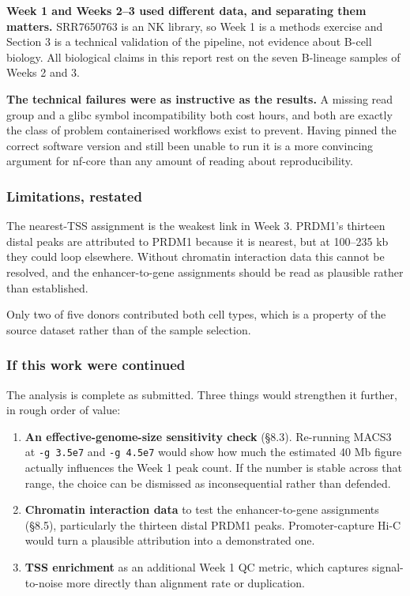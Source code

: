 \documentclass[
  11pt,
  a4paper,
]{article}
\providecommand{\tightlist}{%
  \setlength{\itemsep}{0pt}\setlength{\parskip}{0pt}}
\begin{document}
\textbf{Week 1 and Weeks 2--3 used different data, and separating them
matters.} SRR7650763 is an NK library, so Week 1 is a methods exercise
and Section 3 is a technical validation of the pipeline, not evidence
about B-cell biology. All biological claims in this report rest on the
seven B-lineage samples of Weeks 2 and 3.

\textbf{The technical failures were as instructive as the results.} A
missing read group and a glibc symbol incompatibility both cost hours,
and both are exactly the class of problem containerised workflows exist
to prevent. Having pinned the correct software version and still been
unable to run it is a more convincing argument for nf-core than any
amount of reading about reproducibility.

\hypertarget{limitations-restated}{%
\subsubsection{Limitations, restated}\label{limitations-restated}}

The nearest-TSS assignment is the weakest link in Week 3. PRDM1's
thirteen distal peaks are attributed to PRDM1 because it is nearest, but
at 100--235 kb they could loop elsewhere. Without chromatin interaction
data this cannot be resolved, and the enhancer-to-gene assignments
should be read as plausible rather than established.

Only two of five donors contributed both cell types, which is a property
of the source dataset rather than of the sample selection.

\hypertarget{if-this-work-were-continued}{%
\subsubsection{If this work were
continued}\label{if-this-work-were-continued}}

The analysis is complete as submitted. Three things would strengthen it
further, in rough order of value:

\begin{enumerate}
\def\labelenumi{\arabic{enumi}.}
\tightlist
\item
  \textbf{An effective-genome-size sensitivity check} (§8.3). Re-running
  MACS3 at \texttt{-g\ 3.5e7} and \texttt{-g\ 4.5e7} would show how much
  the estimated 40 Mb figure actually influences the Week 1 peak count.
  If the number is stable across that range, the choice can be dismissed
  as inconsequential rather than defended.
\item
  \textbf{Chromatin interaction data} to test the enhancer-to-gene
  assignments (§8.5), particularly the thirteen distal PRDM1 peaks.
  Promoter-capture Hi-C would turn a plausible attribution into a
  demonstrated one.
\item
  \textbf{TSS enrichment} as an additional Week 1 QC metric, which
  captures signal-to-noise more directly than alignment rate or
  duplication.
\end{enumerate}
\end{document}
